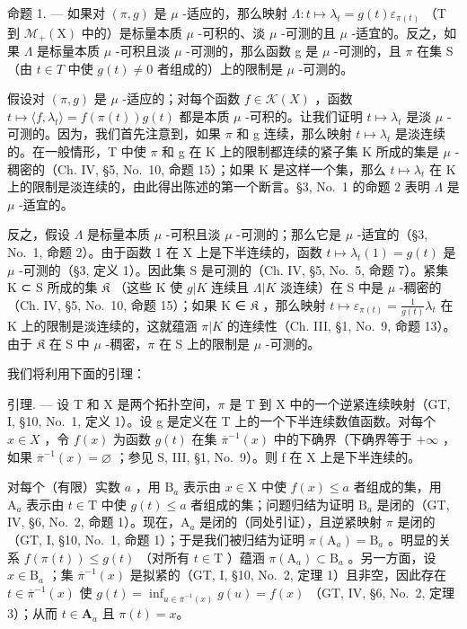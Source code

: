 命题 1. --- 如果对 \((\pi, g)\) 是 \(\mu\) -适应的，那么映射 \(\Lambda: t \mapsto \lambda_t = g(t) \varepsilon_{\pi(t)}\) （T 到 \(\mathcal{M}_+(\mathrm{X})\) 中的）是标量本质 \(\mu\) -可积的、淡 \(\mu\) -可测的且 \(\mu\) -适宜的。反之，如果 \(\Lambda\) 是标量本质 \(\mu\) -可积且淡 \(\mu\) -可测的，那么函数 g 是 \(\mu\) -可测的，且 \(\pi\) 在集 S（由 \(t \in T\) 中使 \(g(t) \neq 0\) 者组成的）上的限制是 \(\mu\) -可测的。

假设对 \((\pi,g)\) 是 \(\mu\) -适应的；对每个函数 \(f \in \mathcal{K}(X)\) ，函数 \(t \mapsto \langle f, \lambda_t \rangle = f(\pi(t))g(t)\) 都是本质 \(\mu\) -可积的。让我们证明 \(t \mapsto \lambda_t\) 是淡 \(\mu\) -可测的。因为，我们首先注意到，如果 \(\pi\) 和 g 连续，那么映射 \(t \mapsto \lambda_t\) 是淡连续的。在一般情形，T 中使 \(\pi\) 和 g 在 K 上的限制都连续的紧子集 K 所成的集是 \(\mu\) -稠密的（Ch. IV, §5, No.~10, 命题 15）；如果 K 是这样一个集，那么 \(t \mapsto \lambda_t\) 在 K 上的限制是淡连续的，由此得出陈述的第一个断言。§3, No.~1 的命题 2 表明 \(\Lambda\) 是 \(\mu\) -适宜的。

反之，假设 \(\Lambda\) 是标量本质 \(\mu\) -可积且淡 \(\mu\) -可测的；那么它是 \(\mu\) -适宜的（§3, No.~1, 命题 2）。由于函数 1 在 X 上是下半连续的，函数 \(t \mapsto \lambda_t(1) = g(t)\) 是 \(\mu\) -可测的（§3, 定义 1）。因此集 S 是可测的（Ch. IV, §5, No.~5, 命题 7）。紧集 K ⊂ S 所成的集 \(\mathfrak{K}\) （这些 K 使 \(g|K\) 连续且 \(\Lambda|K\) 淡连续）在 S 中是 \(\mu\) -稠密的（Ch. IV, §5, No.~10, 命题 15）；如果 K ∈ \(\mathfrak{K}\) ，那么映射 \(t \mapsto \varepsilon_{\pi(t)} = \frac{1}{g(t)} \lambda_t\) 在 K 上的限制是淡连续的，这就蕴涵 \(\pi|K\) 的连续性（Ch. III, §1, No.~9, 命题 13）。由于 \(\mathfrak{K}\) 在 S 中 \(\mu\) -稠密，\(\pi\) 在 S 上的限制是 \(\mu\) -可测的。

我们将利用下面的引理：

引理. --- 设 T 和 X 是两个拓扑空间，\(\pi\) 是 T 到 X 中的一个逆紧连续映射（GT, I, §10, No.~1, 定义 1）。设 g 是定义在 T 上的一个下半连续数值函数。对每个 \(x \in X\) ，令 \(f(x)\) 为函数 \(g(t)\) 在集 \(\overline{\pi}^{-1}(x)\) 中的下确界（下确界等于 \(+\infty\) ，如果 \(\overline{\pi}^{-1}(x) = \varnothing\) ；参见 S, III, §1, No.~9）。则 f 在 X 上是下半连续的。

对每个（有限）实数 \(a\) ，用 \(\mathrm{B}_a\) 表示由 \(x \in \mathrm{X}\) 中使 \(f(x) \leqslant a\) 者组成的集，用 \(\mathrm{A}_a\) 表示由 \(t \in \mathrm{T}\) 中使 \(g(t) \leqslant a\) 者组成的集；问题归结为证明 \(\mathrm{B}_a\) 是闭的（GT, IV, §6, No.~2, 命题 1）。现在，\(\mathrm{A}_a\) 是闭的（同处引证），且逆紧映射 \(\pi\) 是闭的（GT, I, §10, No.~1, 命题 1）；于是我们被归结为证明 \(\pi(\mathrm{A}_a) = \mathrm{B}_a\) 。明显的关系 \(f(\pi(t)) \leqslant g(t)\) （对所有 \(t \in \mathrm{T}\) ）蕴涵 \(\pi(\mathrm{A}_a) \subset \mathrm{B}_a\) 。另一方面，设 \(x \in \mathrm{B}_a\) ；集 \(\overline{\pi}^{-1}(x)\) 是拟紧的（GT, I, §10, No.~2, 定理 1）且非空，因此存在 \(t \in \overline{\pi}^{-1}(x)\) 使 \(g(t) = \inf_{u\in \overline{\pi}^{-1} (x)}g(u) = f(x)\) （GT, IV, §6, No.~2, 定理 3）；从而 \(t\in \mathbf{A}_a\) 且 \(\pi (t) = x\)。

